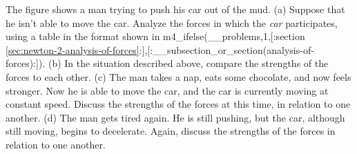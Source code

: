 The figure shows a man trying to push his car out of the mud. (a) Suppose that he isn't
able to move the car. Analyze the forces in which the \emph{car} participates,
using a table in the format shown in m4_ifelse(__problems,1,[:section \ref{sec:newton-2-analysis-of-forces}:],[:__subsection_or_section(analysis-of-forces):]).
(b) In the situation described above, compare the strengths of the forces to each other.
(c) The man takes a nap, eats some chocolate, and now feels stronger. Now he is
able to move the car, and the car is currently
moving at constant speed. Discuss the strengths of the forces at this time, in relation to one
another.
(d) The man gets tired again. He is still pushing, but the car, although still moving, begins to decelerate.
Again, discuss the strengths of the forces in relation to one another.
